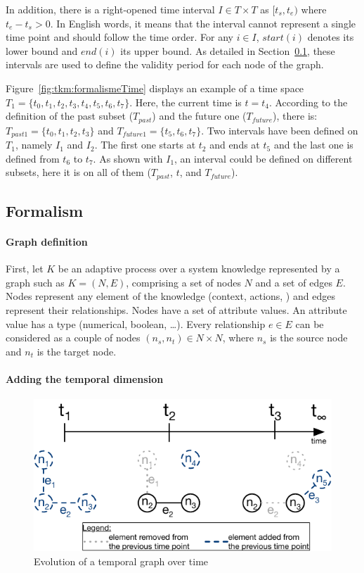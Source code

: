 In addition, there is a right-opened time interval $I \in T \times T$ as $[t_s, t_e)$ where $t_e - t_s > 0$.
In English words, it means that the interval cannot represent a single time point and should follow the time order. 
For any $i \in I$, $start(i)$ denotes its lower bound and $end(i)$ its upper bound.
As detailed in Section~\ref{sec:tkm:formalism}, these intervals are used to define the validity period for each node of the graph. 

Figure~\ref{fig:tkm:formalismeTime} displays an example of a time space $T_1 = \{t_0, t_1, t_2, t_3, t_4, t_5, t_6, t_7\}$.
Here, the current time is $t = t_4$.
According to the definition of the past subset ($T_{past}$) and the future one ($T_{future}$), there is: $T_{past1} =  \{t_0, t_1, t_2, t_3\}$ and $T_{future1} = \{t_5, t_6, t_7\}$.
Two intervals have been defined on $T_1$, namely $I_1$ and $I_2$.
The first one starts at $t_2$ and ends at $t_5$ and the last one is defined from $t_6$ to $t_7$.
As shown with $I_1$, an interval could be defined on different subsets, here it is on all of them ($T_{past}$, $t$, and $T_{future}$).

\subsection{Formalism}
\label{sec:tkm:formalism}
 
\paragraph{Graph definition}
First, let $K$ be an adaptive process over a system \gls{knowledge} represented by a graph such as $K = (N, E)$, comprising a set of nodes $N$ and a set of edges $E$.
Nodes represent any element of the knowledge (context, actions, \etc) and edges represent their relationships.
Nodes have a set of attribute values.
An attribute value has a type (numerical, boolean, \ldots). 
Every relationship $e \in E$ can be considered as a couple of nodes $(n_s, n_t) \in N \times N$, where $n_s$ is the source node and $n_t$ is the target node.

\paragraph{Adding the temporal dimension}

\begin{figure}
   \centering
	\includegraphics{img/chapt-tkm/validityExample}
	\caption{Evolution of a temporal graph over time}
	\label{fig:tkm:validityEx}
\end{figure}

